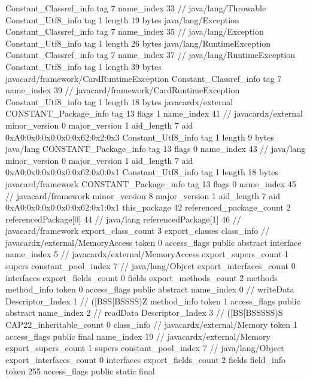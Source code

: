 {{{		}
		Constant_Classref_info {
			tag	7
			name_index	33		// java/lang/Throwable
		}
		Constant_Utf8_info {
			tag	1
			length	19
			bytes	java/lang/Exception
		}
		Constant_Classref_info {
			tag	7
			name_index	35		// java/lang/Exception
		}
		Constant_Utf8_info {
			tag	1
			length	26
			bytes	java/lang/RuntimeException
		}
		Constant_Classref_info {
			tag	7
			name_index	37		// java/lang/RuntimeException
		}
		Constant_Utf8_info {
			tag	1
			length	39
			bytes	javacard/framework/CardRuntimeException
		}
		Constant_Classref_info {
			tag	7
			name_index	39		// javacard/framework/CardRuntimeException
		}
		Constant_Utf8_info {
			tag	1
			length	18
			bytes	javacardx/external
		}
		CONSTANT_Package_info {
			tag	13
			flags	1
			name_index	41		// javacardx/external
			minor_version	0
			major_version	1
			aid_length	7
			aid	0xA0:0x0:0x0:0x0:0x62:0x2:0x3
		}
		Constant_Utf8_info {
			tag	1
			length	9
			bytes	java/lang
		}
		CONSTANT_Package_info {
			tag	13
			flags	0
			name_index	43		// java/lang
			minor_version	0
			major_version	1
			aid_length	7
			aid	0xA0:0x0:0x0:0x0:0x62:0x0:0x1
		}
		Constant_Utf8_info {
			tag	1
			length	18
			bytes	javacard/framework
		}
		CONSTANT_Package_info {
			tag	13
			flags	0
			name_index	45		// javacard/framework
			minor_version	8
			major_version	1
			aid_length	7
			aid	0xA0:0x0:0x0:0x0:0x62:0x1:0x1
		}
	}
	this_package	42
	referenced_package_count	2
	referencedPackage[0]	44		// java/lang
	referencedPackage[1]	46		// javacard/framework
	export_class_count	3
	export_classes {
		class_info {		// javacardx/external/MemoryAccess
			token	0
			access_flags	public abstract interface
			name_index	5		// javacardx/external/MemoryAccess
			export_supers_count	1
			supers {
				constant_pool_index	7		// java/lang/Object
			}
			export_interfaces_count	0
			interfaces {
			}
			export_fields_count	0
			fields {
			}
			export_methods_count	2
			methods {
				method_info {
					token	0
					access_flags	public abstract
					name_index	0		// writeData
					Descriptor_Index	1		// ([BSS[BSSSS)Z
				}
				method_info {
					token	1
					access_flags	public abstract
					name_index	2		// readData
					Descriptor_Index	3		// ([BS[BSSSSS)S
				}
			}
			CAP22_inheritable_count	0
		}
		class_info {		// javacardx/external/Memory
			token	1
			access_flags	public final
			name_index	19		// javacardx/external/Memory
			export_supers_count	1
			supers {
				constant_pool_index	7		// java/lang/Object
			}
			export_interfaces_count	0
			interfaces {
			}
			export_fields_count	2
			fields {
			field_info {
				token	255
				access_flags	public static final
}}}}}
